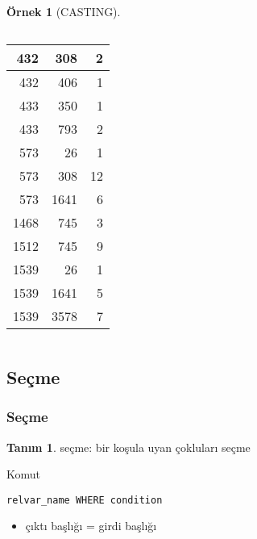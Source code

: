 \documentclass[dvipsnames]{beamer}
\theoremstyle{definition}
\newtheorem{tanim}[theorem]{Tanım}
\theoremstyle{example}
\newtheorem{ornek}[theorem]{Örnek}
\theoremstyle{plain}
\begin{document}
\begin{frame}
\begin{ornek}[CASTING]
\begin{columns}[b]
      \begin{tiny}
      \begin{table}
        \begin{tabular}{|r|r|r|}\hline
    432 &     308 &   2\\\hline
    432 &     406 &   1\\\hline
    433 &     350 &   1\\\hline
    433 &     793 &   2\\\hline
    573 &      26 &   1\\\hline
    573 &     308 &  12\\\hline
    573 &    1641 &   6\\\hline
   1468 &     745 &   3\\\hline
   1512 &     745 &   9\\\hline
   1539 &      26 &   1\\\hline
   1539 &    1641 &   5\\\hline
   1539 &    3578 &   7\\\hline
        \end{tabular}
      \end{table}
      \end{tiny}
    \end{columns}
  \end{ornek}
\end{frame}

\subsection{Seçme}

\begin{frame}[fragile]
  \frametitle{Seçme}

  \begin{tanim}
    \alert{seçme}: bir koşula uyan çokluları seçme
  \end{tanim}

  \pause
  \begin{block}{Komut}
    \begin{lstlisting}
relvar_name WHERE condition
    \end{lstlisting}
  \end{block}

  \pause
  \begin{itemize}
    \item çıktı başlığı = girdi başlığı
  \end{itemize}
\end{frame}
\end{document}
